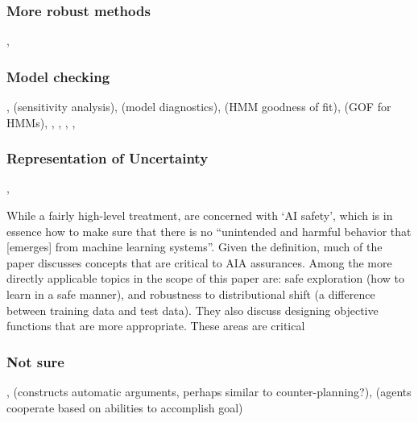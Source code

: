 \subsubsection{More robust methods} \citet{Bashivan2015-fc},  \citet{Tellex2012-hn}

\subsubsection{Model checking} \citet{Titman2008-ct}, \citet{Laskey1995-jp} (sensitivity analysis), \citet{Sinharay2006-yc} (model diagnostics), \citet{Titman2012-zw} (HMM goodness of fit), \citet{MacKay_Altman2004-fl} (GOF for HMMs), \citet{Dannemann2008-ch}, \citet{Titman2010-qx}, \citet{Johnson2004-mv}, \citet{Yuan2012-tb}, \citet{Spiegelhalter2002-ia}

\subsubsection{Representation of Uncertainty} \citet{Laskey2015-gz}, \citet{Costa2012-fa}

    While a fairly high-level treatment, \citet{Amodei2016-xi} are concerned with `AI safety', which is in essence how to make sure that there is no ``unintended and harmful behavior that [emerges] from machine learning systems''. Given the definition, much of the paper discusses concepts that are critical to AIA assurances. Among the more directly applicable topics in the scope of this paper are: safe exploration (how to learn in a safe manner), and robustness to distributional shift (a difference between training data and test data). They also discuss designing objective functions that are more appropriate. These areas are critical 

\subsubsection{Not sure} , \citet{Gutfreund2016-xe} (constructs automatic arguments, perhaps similar to counter-planning?), \citet{Charif2013-vo} (agents cooperate based on abilities to accomplish goal)

